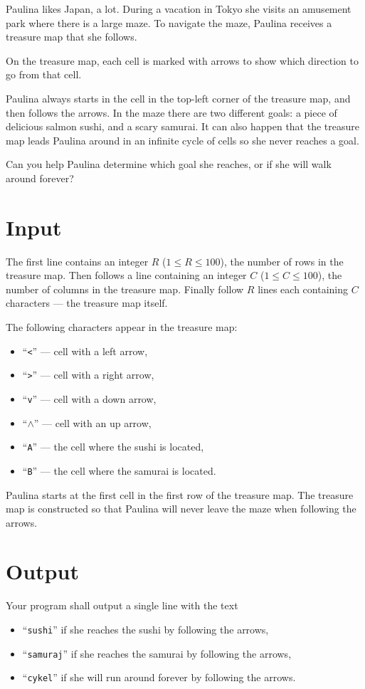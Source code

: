 Paulina likes Japan, a lot.
During a vacation in Tokyo she visits an amusement park where there is a large maze.
To navigate the maze, Paulina receives a treasure map that she follows.

On the treasure map, each cell is marked with arrows to show which direction to go from that cell.

Paulina always starts in the cell in the top-left corner of the treasure map, and then follows the arrows.
In the maze there are two different goals: a piece of delicious salmon sushi, and a scary samurai.
It can also happen that the treasure map leads Paulina around in an infinite cycle of cells so she never reaches a goal.

Can you help Paulina determine which goal she reaches, or if she will walk around forever?

\section*{Input}
The first line contains an integer $R$ ($1 \leq R \leq 100$), the number of rows in the treasure map.
Then follows a line containing an integer $C$ ($1 \leq C \leq 100$), the number of columns in the treasure map.
Finally follow $R$ lines each containing $C$ characters --- the treasure map itself.

The following characters appear in the treasure map:
\begin{itemize}
\item ``\texttt{<}'' --- cell with a left arrow,
\item ``\texttt{>}'' --- cell with a right arrow,
\item ``\texttt{v}'' --- cell with a down arrow,
\item ``$\wedge$'' --- cell with an up arrow,
\item ``\texttt{A}'' --- the cell where the sushi is located,
\item ``\texttt{B}'' --- the cell where the samurai is located.
\end{itemize}

Paulina starts at the first cell in the first row of the treasure map.
The treasure map is constructed so that Paulina will never leave the maze when following the arrows.

\section*{Output}
Your program shall output a single line with the text
\begin{itemize}
\item ``\texttt{sushi}'' if she reaches the sushi by following the arrows,
\item ``\texttt{samuraj}'' if she reaches the samurai by following the arrows,
\item ``\texttt{cykel}'' if she will run around forever by following the arrows.
\end{itemize}

